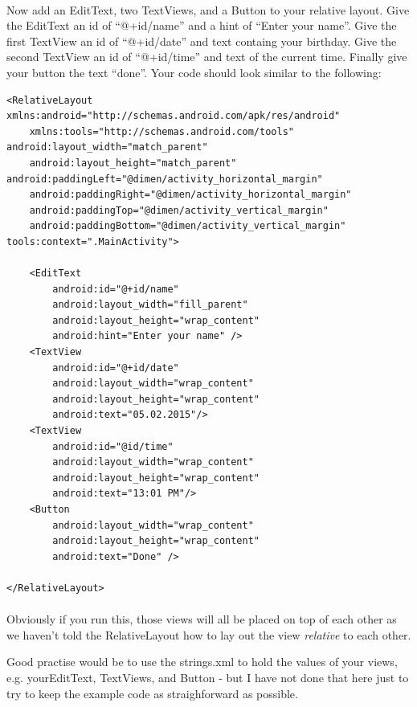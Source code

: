 \documentclass[12pt, a4paper, twoside]{book}
\begin{document}
\paragraph{} Now add an EditText, two TextViews, and a Button to your relative layout. Give the EditText an id of ``@+id/name'' and a hint of ``Enter your name''. Give the first TextView an id of ``@+id/date'' and text containg your birthday. Give the second TextView an id of ``@+id/time'' and text of the current time. Finally give your button the text ``done''. Your code should look similar to the following:

\begin{lstlisting}
<RelativeLayout xmlns:android="http://schemas.android.com/apk/res/android"
    xmlns:tools="http://schemas.android.com/tools" android:layout_width="match_parent"
    android:layout_height="match_parent" android:paddingLeft="@dimen/activity_horizontal_margin"
    android:paddingRight="@dimen/activity_horizontal_margin"
    android:paddingTop="@dimen/activity_vertical_margin"
    android:paddingBottom="@dimen/activity_vertical_margin" tools:context=".MainActivity">

    <EditText
        android:id="@+id/name"
        android:layout_width="fill_parent"
        android:layout_height="wrap_content"
        android:hint="Enter your name" />
    <TextView
        android:id="@+id/date"
        android:layout_width="wrap_content"
        android:layout_height="wrap_content"
        android:text="05.02.2015"/>
    <TextView
        android:id="@id/time"
        android:layout_width="wrap_content"
        android:layout_height="wrap_content"
        android:text="13:01 PM"/>
    <Button
        android:layout_width="wrap_content"
        android:layout_height="wrap_content"
        android:text="Done" />

</RelativeLayout>
\end{lstlisting}

\paragraph{} Obviously if you run this, those views will all be placed on top of each other as we haven't told the RelativeLayout how to lay out the view \emph{relative} to each other.

\begin{framed}
Good practise would be to use the strings.xml to hold the values of your views, e.g. yourEditText, TextViews, and Button - but I have not done that here just to try to keep the example code as straighforward as possible.
\end{framed}
\end{document}
